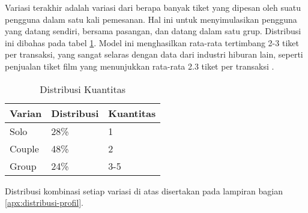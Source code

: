 Variasi terakhir adalah variasi dari berapa banyak tiket yang dipesan oleh suatu pengguna dalam satu kali pemesanan. Hal ini untuk menyimulasikan pengguna yang datang sendiri, bersama pasangan, dan datang dalam satu grup. Distribusi ini dibahas pada tabel \ref{table:distribusi-kuantitas}. Model ini menghasilkan rata-rata tertimbang 2-3 tiket per transaksi, yang sangat selaras dengan data dari industri hiburan lain, seperti penjualan tiket film yang menunjukkan rata-rata 2.3 tiket per transaksi \parencite{vista2025}.

\begin{table}[h]
    \centering
    \caption{Distribusi Kuantitas}
    \label{table:distribusi-kuantitas}
    \begin{tabular}{|l|l|l|}
        \hline
        \textbf{Varian} & \textbf{Distribusi} & \textbf{Kuantitas} \\
        \hline
        Solo            & 28\%                & 1                  \\
        \hline
        Couple          & 48\%                & 2                  \\
        \hline
        Group           & 24\%                & 3-5                \\
        \hline
    \end{tabular}
\end{table}

Distribusi kombinasi setiap variasi di atas disertakan pada lampiran bagian \ref{apx:distribusi-profil}.